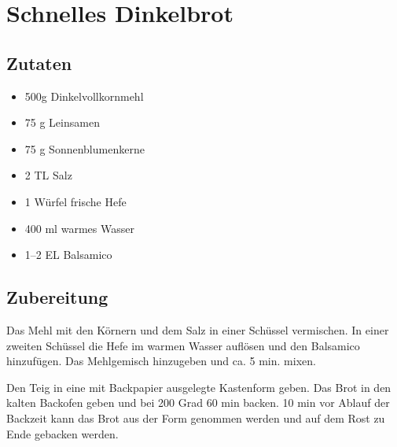 \part{Schnelles Dinkelbrot}
\label{schnellesdinkelbrot}

\chapter{Zutaten}
\label{zutaten}

\begin{itemize}
\item 500g Dinkelvollkornmehl

\item 75 g Leinsamen

\item 75 g Sonnenblumenkerne

\item 2 TL Salz

\item 1 Würfel frische Hefe

\item 400 ml warmes Wasser

\item 1--2 EL Balsamico

\end{itemize}

\chapter{Zubereitung}
\label{zubereitung}

Das Mehl mit den Körnern und dem Salz in einer Schüssel vermischen.
In einer zweiten Schüssel die Hefe im warmen Wasser auflösen und den Balsamico hinzufügen.
Das Mehlgemisch hinzugeben und ca. 5 min. mixen.

Den Teig in eine mit Backpapier ausgelegte Kastenform geben.
Das Brot in den kalten Backofen geben und bei 200 Grad 60 min backen.
10 min vor Ablauf der Backzeit kann das Brot aus der Form genommen werden und auf dem Rost zu Ende gebacken werden.
